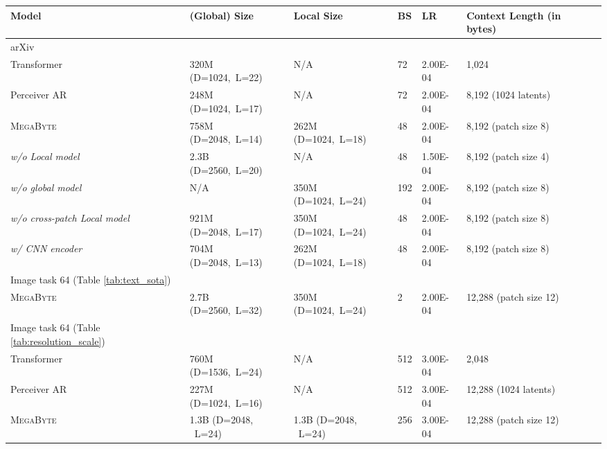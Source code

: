 \documentclass{article}
\newcommand{\fastslow}[0]{\textsc{MegaByte}\xspace}
\newcommand{\megabyte}[0]{\fastslow}
\theoremstyle{plain}
\theoremstyle{definition}
\theoremstyle{remark}
\begin{document}
\begin{table}[h]
\centering
\small
\begin{tabular}{llllllll}
\toprule
Model & (Global) Size & Local Size  & BS & LR  & Context Length (in bytes) \\ 
\midrule
arXiv \\
\midrule
Transformer & 320M (D=1024,~L=22) & N/A  & 72 & 2.00E-04 & 1,024  \\
Perceiver AR  & 248M (D=1024,~L=17) & N/A &  72  & 2.00E-04 & 8,192 (1024 latents)   \\
\megabyte  & 758M (D=2048,~L=14) & 262M (D=1024,~L=18)  &  48  &  2.00E-04 &  8,192 (patch size 8) \\
\hspace{5pt} \textit{w/o Local model} & 2.3B (D=2560,~L=20) & N/A  &  48  &  1.50E-04 &  8,192 (patch size 4) \\
\hspace{5pt} \textit{w/o global model}  & N/A & 350M (D=1024,~L=24)  &  192  &  2.00E-04 &  8,192 (patch size 8) \\
\hspace{5pt} \textit{w/o cross-patch Local model}  & 921M (D=2048,~L=17) & 350M (D=1024,~L=24)  &  48  &  2.00E-04 &  8,192 (patch size 8) \\
\hspace{5pt} \textit{w/ CNN encoder}  & 704M  (D=2048,~L=13) & 262M (D=1024,~L=18)  &  48  &  2.00E-04 &  8,192 (patch size 8) \\

\midrule
Image task 64 (Table \ref{tab:text_sota}) \\
\midrule
\megabyte & 2.7B (D=2560,~L=32) & 350M (D=1024,~L=24)  &  2  &  2.00E-04 &  12,288 (patch size 12)  \\

\midrule
Image task 64 (Table \ref{tab:resolution_scale}) \\
\midrule
Transformer & 760M (D=1536,~L=24) & N/A  &  512  &  3.00E-04 &  2,048  \\
Perceiver AR &  227M (D=1024,~L=16) & N/A  & 512 & 3.00E-04 &  12,288 (1024 latents)  \\
\megabyte & 1.3B (D=2048, ~L=24) & 1.3B (D=2048, ~L=24) &  256 & 3.00E-04  &    12,288 (patch size 12) \\


\end{tabular}
\end{table}
\end{document}
